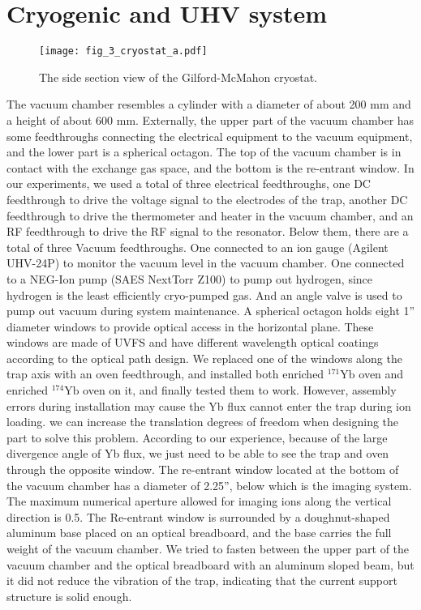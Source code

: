 \section{Cryogenic and UHV system}

\begin{figure}
    \centering
    \texttt{[image: fig\_3\_cryostat\_a.pdf]}
    \caption{The side section view of the Gilford-McMahon cryostat.}
    \label{fig:cryostat_a}
\end{figure}

The vacuum chamber resembles a cylinder with a diameter of about 200 mm and a height of about 600 mm. Externally, the upper part of the vacuum chamber has some feedthroughs connecting the electrical equipment to the vacuum equipment, and the lower part is a spherical octagon. The top of the vacuum chamber is in contact with the exchange gas space, and the bottom is the re-entrant window. In our experiments, we used a total of three electrical feedthroughs, one DC feedthrough to drive the voltage signal to the electrodes of the trap, another DC feedthrough to drive the thermometer and heater in the vacuum chamber, and an RF feedthrough to drive the RF signal to the resonator. Below them, there are a total of three Vacuum feedthroughs. One connected to an ion gauge (Agilent UHV-24P) to monitor the vacuum level in the vacuum chamber. One connected to a NEG-Ion pump (SAES NextTorr Z100) to pump out hydrogen, since hydrogen is the least efficiently cryo-pumped gas. And an angle valve is used to pump out vacuum during system maintenance. A spherical octagon holds eight 1'' diameter windows to provide optical access in the horizontal plane. These windows are made of UVFS and have different wavelength optical coatings according to the optical path design. We replaced one of the windows along the trap axis with an oven feedthrough, and installed both enriched ${ }^{171} \mathrm{Yb}$ oven and enriched ${ }^{174} \mathrm{Yb}$ oven on it, and finally tested them to work. However, assembly errors during installation may cause the Yb flux cannot enter the trap during ion loading. we can increase the translation degrees of freedom when designing the part to solve this problem. According to our experience, because of the large divergence angle of Yb flux, we just need to be able to see the trap and oven through the opposite window. The re-entrant window located at the bottom of the vacuum chamber has a diameter of 2.25'', below which is the imaging system. The maximum numerical aperture allowed for imaging ions along the vertical direction is 0.5. The Re-entrant window is surrounded by a doughnut-shaped aluminum base placed on an optical breadboard, and the base carries the full weight of the vacuum chamber. We tried to fasten between the upper part of the vacuum chamber and the optical breadboard with an aluminum sloped beam, but it did not reduce the vibration of the trap, indicating that the current support structure is solid enough.


